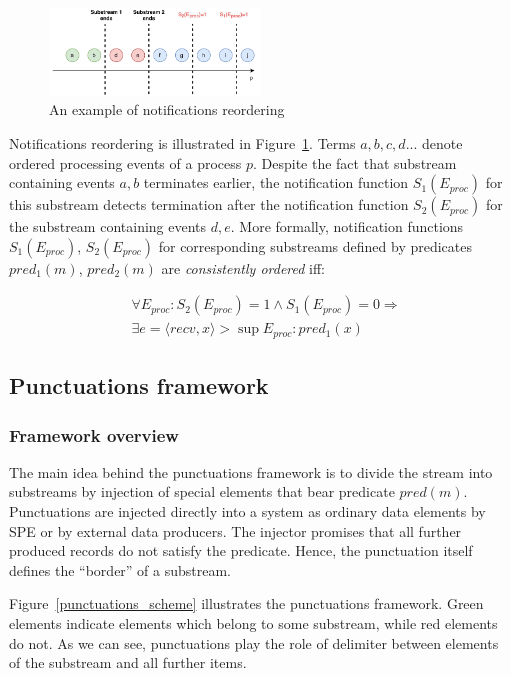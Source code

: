 \begin{figure}[htbp]
  \centering
  \includegraphics[width=0.50\textwidth]{pics/notifications-reordering.pdf}
  \caption{An example of notifications reordering}
  \label{notifications_reordering}
\end{figure}

Notifications reordering is illustrated in Figure~\ref{notifications_reordering}. Terms $a,b,c,d...$ denote ordered processing events of a process $p$. Despite the fact that substream containing events $a,b$ terminates earlier, the notification function $S_1(E_{proc})$ for this substream detects termination after the notification function $S_2(E_{proc})$ for the substream containing events $d,e$. More formally, notification functions $S_1(E_{proc})$, $S_2(E_{proc})$ for corresponding substreams defined by predicates $pred_1(m)$, $pred_2(m)$ are {\em consistently ordered} iff:

\begin{align*}
& \forall E_{proc}: S_2(E_{proc})=1 \wedge S_1(E_{proc})=0 \Longrightarrow  \\
& \exists e=\langle recv, x\rangle > \sup E_{proc} : pred_1(x)
\end{align*}

\subsection{Punctuations framework}

\subsubsection{Framework overview}

The main idea behind the punctuations framework is to divide the stream into substreams by injection of special elements that bear predicate $pred(m)$. Punctuations are injected directly into a system as ordinary data elements by SPE or by external data producers. The injector promises that all further produced records do not satisfy the predicate. Hence, the punctuation itself defines the ``border'' of a substream.

Figure~\ref{punctuations_scheme} illustrates the punctuations framework. Green elements indicate elements which belong to some substream, while red elements do not. As we can see, punctuations play the role of delimiter between elements of the substream and all further items.

